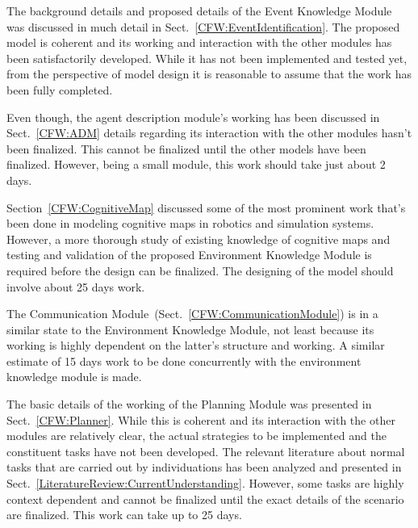 The background details and proposed details of the Event Knowledge Module was discussed in much detail in Sect.~\ref{CFW:EventIdentification}. The proposed model is coherent and its working and interaction with the other modules has been satisfactorily developed. While it has not been implemented and tested yet, from the perspective of model design it is reasonable to assume that the work has been fully completed.

Even though, the agent description module's working has been discussed in Sect.~\ref{CFW:ADM} details regarding its interaction with the other modules hasn't been finalized. This cannot be finalized until the other models have been finalized. However, being a small module, this work should take just about 2 days.

Section~\ref{CFW:CognitiveMap} discussed some of the most prominent work that's been done in modeling cognitive maps in robotics and simulation systems. However, a more thorough study of existing knowledge of cognitive maps and testing and validation of the proposed Environment Knowledge Module is required before the design can be finalized. The designing of the model should involve about 25 days work.

The Communication Module~(Sect.~\ref{CFW:CommunicationModule}) is in a similar state to the Environment Knowledge Module, not least because its working is highly dependent on the latter's structure and working. A similar estimate of 15 days work to be done concurrently with the environment knowledge module is made.

The basic details of the working of the Planning Module was presented in Sect.~\ref{CFW:Planner}. While this is coherent and its interaction with the other modules are relatively clear, the actual strategies to be implemented and the constituent tasks have not been developed. The relevant literature about normal tasks that are carried out by individuations has been analyzed and presented in Sect.~\ref{LiteratureReview:CurrentUnderstanding}. However, some tasks are highly context dependent and cannot be finalized until the exact details of the scenario are finalized. This work can take up to 25 days.

